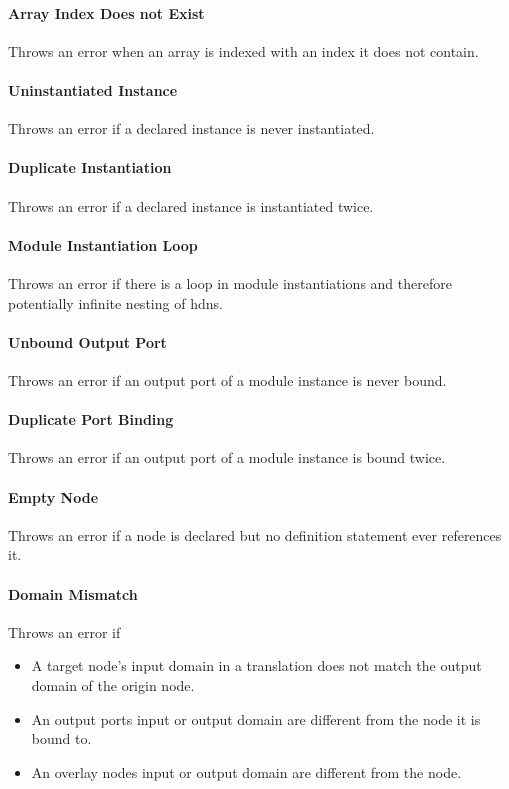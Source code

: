\documentclass[a4paper,11pt,twoside]{report}
\begin{document}
{{{\paragraph{Array Index Does not Exist}
Throws an error when an array is indexed with an index it does not contain.

\paragraph{Uninstantiated Instance}
Throws an error if a declared instance is never instantiated.

\paragraph{Duplicate Instantiation}
Throws an error if a declared instance is instantiated twice.

\paragraph{Module Instantiation Loop}
Throws an error if there is a loop in module instantiations and therefore potentially infinite nesting of \glspl{hdn}.

\paragraph{Unbound Output Port}
Throws an error if an output port of a module instance is never bound.

\paragraph{Duplicate Port Binding}
Throws an error if an output port of a module instance is bound twice.

\paragraph{Empty Node}
Throws an error if a node is declared but no definition statement ever references it.

\paragraph{Domain Mismatch}
Throws an error if
\begin{itemize}
  \item A target node's input domain in a translation does not match the output domain of the origin node.
  \item An output ports input or output domain are different from the node it is bound to.
  \item An overlay nodes input or output domain are different from the node.
\end{itemize}

}}}
\end{document}
